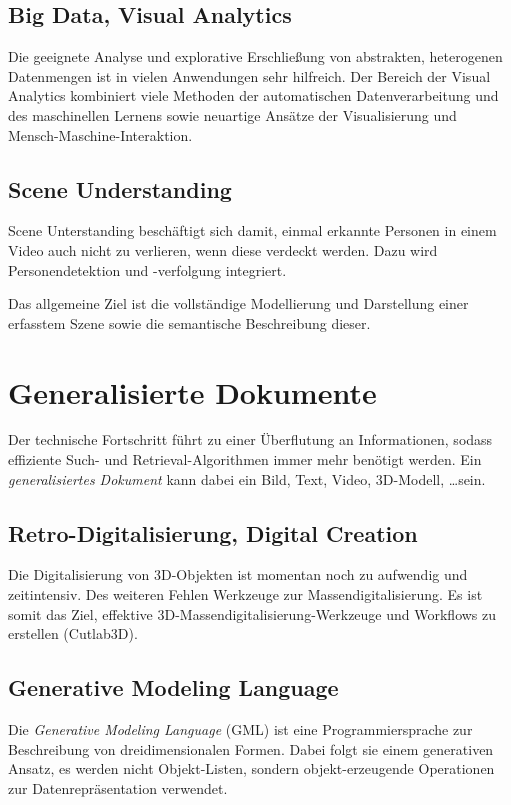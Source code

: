 		\subsection{Big Data, Visual Analytics}
			Die geeignete Analyse und explorative Erschließung von abstrakten, heterogenen Datenmengen ist in vielen Anwendungen sehr hilfreich. Der Bereich der Visual Analytics kombiniert viele Methoden der automatischen Datenverarbeitung und des maschinellen Lernens sowie neuartige Ansätze der Visualisierung und Mensch-Maschine-Interaktion.

		\subsection{Scene Understanding}
			Scene Unterstanding beschäftigt sich \zB damit, einmal erkannte Personen in einem Video auch nicht zu verlieren, wenn diese verdeckt werden. Dazu wird Personendetektion und -verfolgung integriert.
			
			Das allgemeine Ziel ist die vollständige Modellierung und Darstellung einer erfasstem Szene sowie die semantische Beschreibung dieser.

	\section{Generalisierte Dokumente}
		Der technische Fortschritt führt zu einer Überflutung an Informationen, sodass effiziente Such- und Retrieval-Algorithmen immer mehr benötigt werden. Ein \emph{generalisiertes Dokument} kann dabei ein Bild, Text, Video, 3D-Modell, \dots sein.

		\subsection{Retro-Digitalisierung, Digital Creation}
			Die Digitalisierung von 3D-Objekten ist momentan noch zu aufwendig und zeitintensiv. Des weiteren Fehlen Werkzeuge zur Massendigitalisierung. Es ist somit das Ziel, effektive 3D-Massendigitalisierung-Werkzeuge und Workflows zu erstellen (\zB Cutlab3D).

		\subsection{Generative Modeling Language}
			Die \emph{Generative Modeling Language} (GML) ist eine Programmiersprache zur Beschreibung von dreidimensionalen Formen. Dabei folgt sie einem generativen Ansatz, \dh es werden nicht Objekt-Listen, sondern objekt-erzeugende Operationen zur Datenrepräsentation verwendet.

